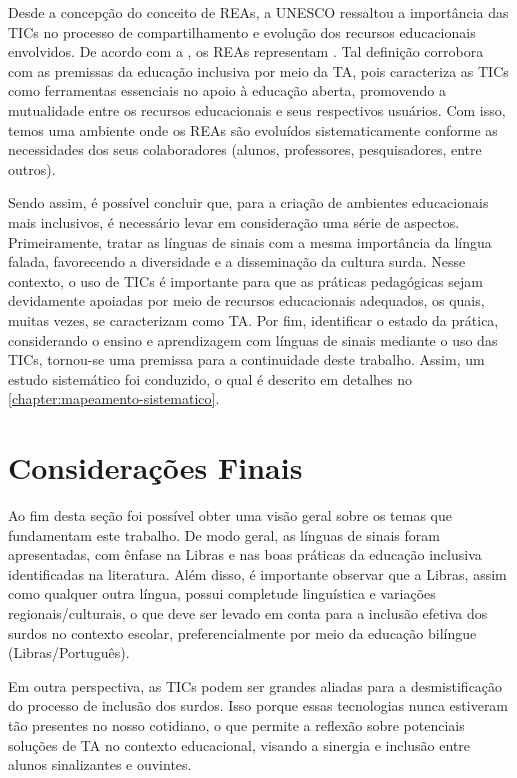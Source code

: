Desde a concepção do conceito de REAs, a UNESCO ressaltou a importância das TICs no processo de compartilhamento e evolução dos recursos educacionais envolvidos. De acordo com a , os REAs representam . Tal definição corrobora com as premissas da educação inclusiva por meio da TA, pois caracteriza as TICs como ferramentas essenciais no apoio à educação aberta, promovendo a mutualidade entre os recursos educacionais e seus respectivos usuários. Com isso, temos uma ambiente onde os REAs são evoluídos sistematicamente conforme as necessidades dos seus colaboradores (alunos, professores, pesquisadores, entre outros).

Sendo assim, é possível concluir que, para a criação de ambientes educacionais mais inclusivos, é necessário levar em consideração uma série de aspectos. Primeiramente, tratar as línguas de sinais com a mesma importância da língua falada, favorecendo a diversidade e a disseminação da cultura surda. Nesse contexto, o uso de TICs é importante para que as práticas pedagógicas sejam devidamente apoiadas por meio de recursos educacionais adequados, os quais, muitas vezes, se caracterizam como TA. Por fim, identificar o estado da prática, considerando o ensino e aprendizagem com línguas de sinais mediante o uso das TICs, tornou-se uma premissa para a continuidade deste trabalho. Assim, um estudo sistemático foi conduzido, o qual é descrito em detalhes no \autoref{chapter:mapeamento-sistematico}.

\section{Considerações Finais}
\label{fundamentacao-teorica:fim}

Ao fim desta seção foi possível obter uma visão geral sobre os temas que fundamentam este trabalho. De modo geral, as línguas de sinais foram apresentadas, com ênfase na Libras e nas boas práticas da educação inclusiva identificadas na literatura. Além disso, é importante observar que a Libras, assim como qualquer outra língua, possui completude linguística e variações regionais/culturais, o que deve ser levado em conta para a inclusão efetiva dos surdos no contexto escolar, preferencialmente por meio da educação bilíngue (Libras/Português).

Em outra perspectiva, as TICs podem ser grandes aliadas para a desmistificação do processo de inclusão dos surdos. Isso porque essas tecnologias nunca estiveram tão presentes no nosso cotidiano, o que permite a reflexão sobre potenciais soluções de TA no contexto educacional, visando a sinergia e inclusão entre alunos sinalizantes e ouvintes.

